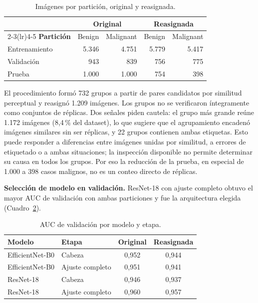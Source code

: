 \documentclass[conference]{IEEEtran}
\begin{document}
	\begin{table}[H]
		\centering
		\caption{Imágenes por partición, original y reasignada.}
		\label{tab:particion}
		\begin{tabular}{@{}lrrrr@{}}
			\toprule
			& \multicolumn{2}{c}{\textbf{Original}} & \multicolumn{2}{c}{\textbf{Reasignada}} \\
			\cmidrule(lr){2-3}\cmidrule(lr){4-5}
			\textbf{Partición} & Benign & Malignant & Benign & Malignant \\
			\midrule
			Entrenamiento & 5.346 & 4.751 & 5.779 & 5.417 \\
			Validación    & 943   & 839   & 756   & 775 \\
			Prueba        & 1.000 & 1.000 & 754   & 398 \\
			\bottomrule
		\end{tabular}
	\end{table}
	
	El procedimiento formó 732 grupos a partir de pares candidatos por similitud perceptual y reasignó 1.209 imágenes. Los grupos no se verificaron íntegramente como conjuntos de réplicas. Dos señales piden cautela: el grupo más grande reúne 1.172 imágenes (8,4\,\% del dataset), lo que sugiere que el agrupamiento encadenó imágenes similares sin ser réplicas, y 22 grupos contienen ambas etiquetas. Esto puede responder a diferencias entre imágenes unidas por similitud, a errores de etiquetado o a ambas situaciones; la inspección disponible no permite determinar su causa en todos los grupos. Por eso la reducción de la prueba, en especial de 1.000 a 398 casos malignos, no es un conteo directo de réplicas.
	
	\textbf{Selección de modelo en validación.} ResNet-18 con ajuste completo obtuvo el mayor AUC de validación con ambas particiones y fue la arquitectura elegida (Cuadro~\ref{tab:val}).
	
	\begin{table}[H]
		\centering
		\caption{AUC de validación por modelo y etapa.}
		\label{tab:val}
		\begin{tabular}{@{}llcc@{}}
			\toprule
			\textbf{Modelo} & \textbf{Etapa} & \textbf{Original} & \textbf{Reasignada} \\
			\midrule
			EfficientNet-B0 & Cabeza          & 0,952 & 0,944 \\
			EfficientNet-B0 & Ajuste completo & 0,951 & 0,941 \\
			ResNet-18       & Cabeza          & 0,946 & 0,937 \\
			ResNet-18       & Ajuste completo & 0,960 & 0,957 \\
			\bottomrule
		\end{tabular}
	\end{table}
	
\end{document}

